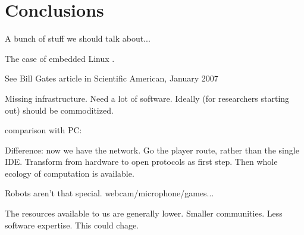 
\section{Conclusions}

A bunch of stuff we should talk about...

\cite{kramer2007development}
\cite{gerkey03player}
\cite{natale05developmental}
\cite{nesnas2006claraty}
\cite{vaughan2006really}
\cite{vonkrogh2006promise}

The case of embedded Linux \cite{henkel2006selective}.

See Bill Gates article in Scientific American, January 2007

Missing infrastructure.
Need a lot of software.
Ideally (for researchers starting out) should be commoditized.


comparison with PC:

Difference: now we have the network.  Go the player route, rather than
the single IDE.  Transform from hardware to open protocols as first
step.  Then whole ecology of computation is available.

Robots aren't that special.  webcam/microphone/games...

The resources available to us are generally lower.  Smaller communities.
Less software expertise.  This could chage.






